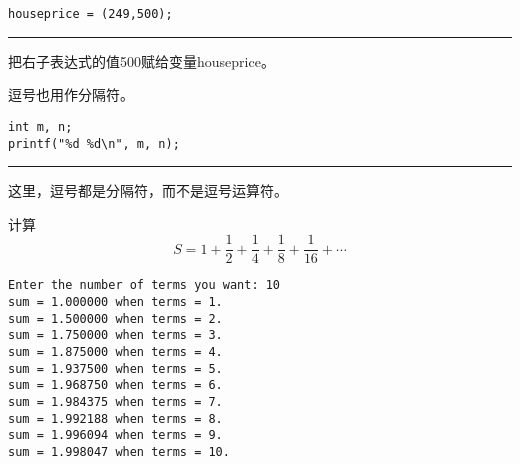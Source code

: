 \begin{frame}[fragile]\ft{\secname}
\begin{lstlisting}
houseprice = (249,500);
\end{lstlisting}
\rule{\textwidth}{1mm}\pause\vspace{0.1in}

把右子表达式的值500赋给变量houseprice。
\end{frame}

\begin{frame}[fragile]\ft{\secname}
逗号也用作分隔符。
\begin{lstlisting}
int m, n;
printf("%d %d\n", m, n);
\end{lstlisting}
\rule{\textwidth}{1mm}\pause\vspace{0.1in}

这里，逗号都是分隔符，而不是逗号运算符。
\end{frame}

\begin{frame}[fragile]\ft{\secname}
\begin{free}[例]{}
计算
$$
S = 1 + \frac12 + \frac14 + \frac18 + \frac1{16} +\cdots 
$$
\end{free}
\end{frame}

\begin{frame}[fragile]\ft{\secname}

\end{frame}

\begin{frame}[fragile]\ft{\secname}
 \begin{lstlisting}[backgroundcolor=\color{red!10}]
Enter the number of terms you want: 10
sum = 1.000000 when terms = 1.
sum = 1.500000 when terms = 2.
sum = 1.750000 when terms = 3.
sum = 1.875000 when terms = 4.
sum = 1.937500 when terms = 5.
sum = 1.968750 when terms = 6.
sum = 1.984375 when terms = 7.
sum = 1.992188 when terms = 8.
sum = 1.996094 when terms = 9.
sum = 1.998047 when terms = 10.
\end{lstlisting}
\end{frame}
